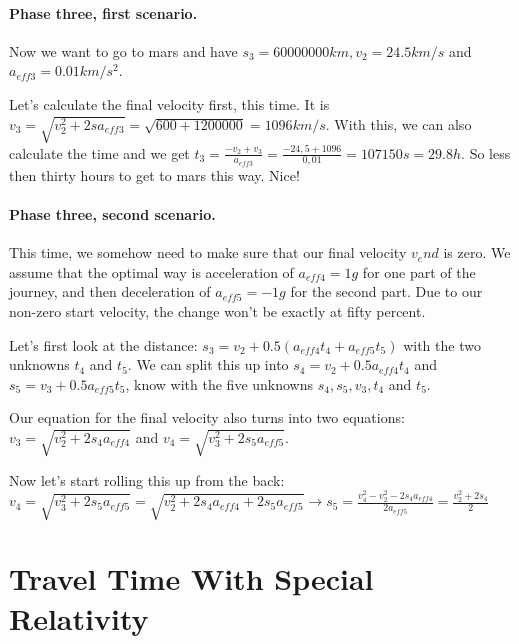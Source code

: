 \documentclass[10pt]{article}
\begin{document}
	\paragraph{Phase three, first scenario.}	
	Now we want to go to mars and have $s_3 = 60 000 000 km, v_2 = 24.5 km/s$ and $a_{eff3} = 0.01 km/s^2$.
	
	Let's calculate the final velocity first, this time. It is $v_3 = \sqrt{v^2_2 + 2sa_{eff3}} = \sqrt{600 + 1 200 000} = 1096 km/s$. With this, we can also calculate the time and we get $t_3 = \frac{-v_2 + v_3}{a_{eff3}} = \frac{-24,5 + 1096}{0,01} = 107150 s = 29.8 h$. So less then thirty hours to get to mars this way. Nice!
	
	\paragraph{Phase three, second scenario.}	
	This time, we somehow need to make sure that our final velocity $v_end$ is zero. We assume that the optimal way is acceleration of $a_{eff4} = 1g$ for one part of the journey, and then deceleration of $a_{eff5} = -1g$ for the second part. Due to our non-zero start velocity, the change won't be exactly at fifty percent.
	
	Let's first look at the distance: $s_3 = v_2 + 0.5(a_{eff4}t_4 + a_{eff5}t_5)$ with the two unknowns $t_4$ and $t_5$. We can split this up into $s_4 = v_2 + 0.5a_{eff4}t_4$ and $s_5 = v_3 + 0.5a_{eff5}t_5$, know with the five unknowns  $s_4, s_5, v_3, t_4$ and $t_5$.
	
	Our equation for the final velocity also turns into two equations: $v_3 = \sqrt{v^2_2+2s_4a_{eff4}}$ and $v_4 = \sqrt{v^2_3+2s_5a_{eff5}}$.
	
	Now let's start rolling this up from the back: $v_4 = \sqrt{v^2_3+2s_5a_{eff5}} = \sqrt{v^2_2+2s_4a_{eff4}+2s_5a_{eff5}} \rightarrow s_5 = \frac{v^2_4-v^2_2-2s_4a_{eff4}}{2a_{eff5}} = \frac{v^2_2+2s_4}{2}$
	
	\section{Travel Time With Special Relativity}
\end{document}
